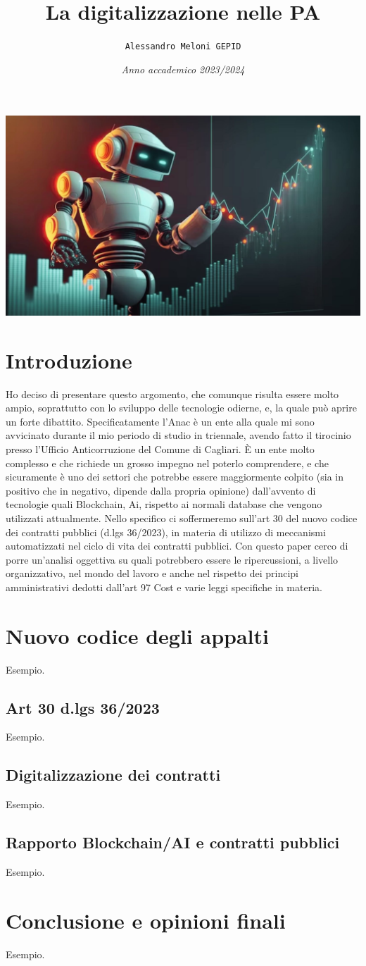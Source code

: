 \documentclass{article}
\title{\textbf{La digitalizzazione nelle PA}}
\author{\texttt{Alessandro Meloni GEPID}}
\date{\textit{Anno accademico 2023/2024}}
\begin{document}
\maketitle
    \includegraphics[width = 0.9\linewidth]{Img.jpg}
\centering \tableofcontents
\newpage\centering
\section{Introduzione}
\flushleft \begin{justify}
Ho deciso di presentare questo argomento, che comunque risulta essere molto ampio, soprattutto con lo sviluppo delle tecnologie odierne, e, la quale può aprire un forte dibattito. Specificatamente l'Anac è un ente alla quale mi sono avvicinato durante il mio periodo di studio in triennale, avendo fatto il tirocinio presso l'Ufficio Anticorruzione del Comune di Cagliari. È un ente molto complesso e che richiede un grosso impegno nel poterlo comprendere, e che sicuramente è uno dei settori che potrebbe essere maggiormente colpito (sia in positivo che in negativo, dipende dalla propria opinione) dall'avvento di tecnologie quali Blockchain, Ai, rispetto ai normali database che vengono utilizzati attualmente. Nello specifico ci soffermeremo sull'art 30 del nuovo codice dei contratti pubblici (d.lgs 36/2023), in materia di utilizzo di meccanismi automatizzati nel ciclo di vita dei contratti pubblici. Con questo paper cerco di porre un'analisi oggettiva su quali potrebbero essere le ripercussioni, a livello organizzativo, nel mondo del lavoro e anche nel rispetto dei principi amministrativi dedotti dall'art 97 Cost e varie leggi specifiche in materia.
\end{justify}

\newpage\centering
\section{Nuovo codice degli appalti}
\flushleft Esempio.

\flushleft \subsection{Art 30 d.lgs 36/2023}
Esempio.
\flushleft \subsection{Digitalizzazione dei contratti}
Esempio.
\flushleft \subsection{Rapporto Blockchain/AI e contratti pubblici}
Esempio.

\newpage \centering
\section{Conclusione e opinioni finali}
\flushleft Esempio.
\end{document}
